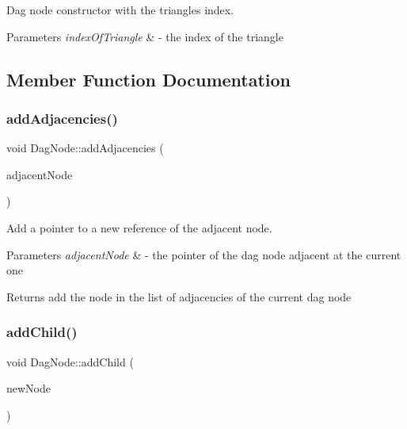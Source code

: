 Dag node constructor with the triangle\textquotesingle{}s index. 


\begin{DoxyParams}{Parameters}
{\em index\+Of\+Triangle} & -\/ the index of the triangle \\
\hline
\end{DoxyParams}


\subsection{Member Function Documentation}
\mbox{\label{classDagNode_a106926f7429347b10746b66039b1609b}} 
\subsubsection{\texorpdfstring{add\+Adjacencies()}{addAdjacencies()}}
{\footnotesize\ttfamily void Dag\+Node\+::add\+Adjacencies (\begin{DoxyParamCaption}\item[{\hyperlink{classDagNode}{Dag\+Node} $\ast$\&}]{adjacent\+Node }\end{DoxyParamCaption})\hspace{0.3cm}{\ttfamily [inline]}}



Add a pointer to a new reference of the adjacent node. 


\begin{DoxyParams}{Parameters}
{\em adjacent\+Node} & -\/ the pointer of the dag node adjacent at the current one \\
\hline
\end{DoxyParams}
\begin{DoxyReturn}{Returns}
add the node in the list of adjacencies of the current dag node 
\end{DoxyReturn}
\mbox{\label{classDagNode_addfd2cfc5237217967c418bf72fd7f3e}} 
\subsubsection{\texorpdfstring{add\+Child()}{addChild()}}
{\footnotesize\ttfamily void Dag\+Node\+::add\+Child (\begin{DoxyParamCaption}\item[{\hyperlink{classDagNode}{Dag\+Node} $\ast$}]{new\+Node }\end{DoxyParamCaption})\hspace{0.3cm}{\ttfamily [inline]}}



